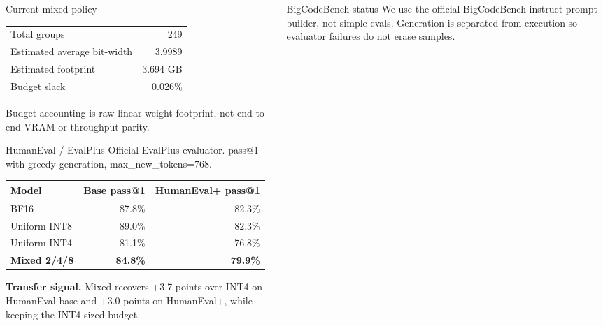 \documentclass[final]{beamer}
\begin{document}
\begin{frame}[t]
\begin{columns}[t,totalwidth=\textwidth]
\begin{column}{0.32\textwidth}
{\begin{block}{Current mixed policy}
      \vspace{0.35cm}
      \begin{tabular}{lr}
        Total groups & 249\\
        Estimated average bit-width & 3.9989\\
        Estimated footprint & 3.694 GB\\
        Budget slack & 0.026\%\\
      \end{tabular}

      \vspace{0.3cm}
      {\small Budget accounting is raw linear weight footprint, not end-to-end VRAM or throughput parity.}
    \end{block}
    }

    \begin{block}{HumanEval / EvalPlus}
      \small Official EvalPlus evaluator. pass@1 with greedy generation, max\_new\_tokens=768.
      \vspace{0.35cm}

      \begin{tabular}{lrr}
        \toprule
        Model & Base pass@1 & HumanEval+ pass@1\\
        \midrule
        BF16 & 87.8\% & 82.3\%\\
        Uniform INT8 & 89.0\% & 82.3\%\\
        Uniform INT4 & 81.1\% & 76.8\%\\
        \textbf{Mixed 2/4/8} & \textbf{84.8\%} & \textbf{79.9\%}\\
        \bottomrule
      \end{tabular}

      \vspace{0.45cm}
      \colorbox{PosterGreenSoft}{\parbox{0.94\textwidth}{
      \textbf{Transfer signal.}
      Mixed recovers +3.7 points over INT4 on HumanEval base and +3.0 points on
      HumanEval+, while keeping the INT4-sized budget.
      }}
    \end{block}
  \end{column}

  \begin{column}{0.32\textwidth}
    \begin{block}{BigCodeBench status}
      \justifying
      We use the official BigCodeBench instruct prompt builder, not simple-evals.
      Generation is separated from execution so evaluator failures do not erase samples.


\end{block}
\end{column}
\end{columns}
\end{frame}
\end{document}
